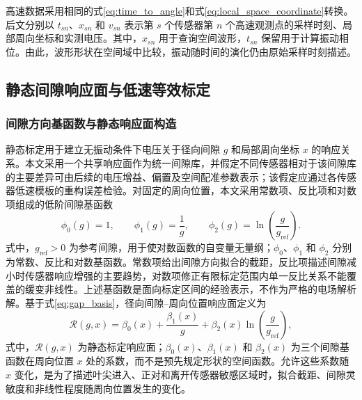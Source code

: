 \documentclass[UTF8,12pt,a4paper]{ctexart}
\newcommand{\Rcal}{\mathcal{R}}
\begin{document}
高速数据采用相同的式\eqref{eq:time_to_angle}和式\eqref{eq:local_space_coordinate}转换。后文分别以 $t_{sn}$、$x_{sn}$ 和 $v_{sn}$ 表示第 $s$ 个传感器第 $n$ 个高速观测点的采样时刻、局部周向坐标和实测电压。其中，$x_{sn}$ 用于查询空间波形，$t_{sn}$ 保留用于计算振动相位。由此，波形形状在空间域中比较，振动随时间的演化仍由原始采样时刻描述。

\subsection{静态间隙响应面与低速等效标定}

\subsubsection{间隙方向基函数与静态响应面构造}

静态标定用于建立无振动条件下电压关于径向间隙 $g$ 和局部周向坐标 $x$ 的响应关系。本文采用一个共享响应面作为统一间隙库，并假定不同传感器相对于该间隙库的主要差异可由后续的电压增益、偏置及空间配准参数表示；该假定应通过各传感器低速模板的重构误差检验。对固定的周向位置，本文采用常数项、反比项和对数项组成的低阶间隙基函数
\begin{equation}
\phi_0(g)=1,
\qquad
\phi_1(g)=\frac{1}{g},
\qquad
\phi_2(g)=\ln\left(\frac{g}{g_{\mathrm{ref}}}\right).
\label{eq:gap_basis}
\end{equation}
式中，$g_{\mathrm{ref}}>0$ 为参考间隙，用于使对数函数的自变量无量纲；$\phi_0$、$\phi_1$ 和 $\phi_2$ 分别为常数、反比和对数基函数。常数项给出间隙方向拟合的截距，反比项描述间隙减小时传感器响应增强的主要趋势，对数项修正有限标定范围内单一反比关系不能覆盖的缓变非线性。上述基函数是面向标定区间的经验表示，不作为严格的电场解析解。基于式\eqref{eq:gap_basis}，径向间隙--周向位置响应面定义为
\begin{equation}
\Rcal(g,x)
=\beta_0(x)+\frac{\beta_1(x)}{g}
+\beta_2(x)\ln\left(\frac{g}{g_{\mathrm{ref}}}\right),
\label{eq:response_surface}
\end{equation}
式中，$\Rcal(g,x)$ 为静态标定响应面；$\beta_0(x)$、$\beta_1(x)$ 和 $\beta_2(x)$ 为三个间隙基函数在周向位置 $x$ 处的系数，而不是预先规定形状的空间函数。允许这些系数随 $x$ 变化，是为了描述叶尖进入、正对和离开传感器敏感区域时，拟合截距、间隙灵敏度和非线性程度随周向位置发生的变化。
\end{document}
